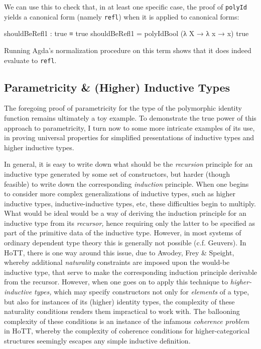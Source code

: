 \documentclass[
  12pt]{article}
\newenvironment{Shaded}{\begin{snugshade}}{\end{snugshade}}
\newcommand{\NormalTok}[1]{\textcolor[rgb]{0.12,0.11,0.11}{#1}}
\newcommand{\OtherTok}[1]{\textcolor[rgb]{0.00,0.43,0.16}{#1}}
\begin{document}
We can use this to check that, in at least one specific case, the proof
of \texttt{polyId} yields a canonical form (namely \texttt{refl}) when
it is applied to canonical forms:

\begin{Shaded}
\begin{Highlighting}[]
\NormalTok{    shouldBeRefl1 }\OtherTok{:}\NormalTok{ true ≡ true}
\NormalTok{    shouldBeRefl1 }\OtherTok{=}\NormalTok{ polyIdBool }\OtherTok{(λ}\NormalTok{ X }\OtherTok{→} \OtherTok{λ}\NormalTok{ x }\OtherTok{→}\NormalTok{ x}\OtherTok{)}\NormalTok{ true}
\end{Highlighting}
\end{Shaded}

Running Agda's normalization procedure on this term shows that it does
indeed evaluate to \texttt{refl}.

\subsection{Parametricity \& (Higher) Inductive
Types}\label{parametricity-higher-inductive-types}

The foregoing proof of parametricity for the type of the polymorphic
identity function remains ultimately a toy example. To demonstrate the
true power of this approach to parametricity, I turn now to some more
intricate examples of its use, in proving universal properties for
simplified presentations of inductive types and higher inductive types.

In general, it is easy to write down what should be the \emph{recursion}
principle for an inductive type generated by some set of constructors,
but harder (though feasible) to write down the corresponding
\emph{induction} principle. When one begins to consider more complex
generalizations of inductive types, such as higher inductive types,
inductive-inductive types, etc, these difficulties begin to multiply.
What would be ideal would be a way of deriving the induction principle
for an inductive type from its \emph{recursor,} hence requiring only the
latter to be specified as part of the primitive data of the inductive
type. However, in most systems of ordinary dependent type theory this is
generally not possible (c.f. Geuvers). In HoTT, there is one way around
this issue, due to Awodey, Frey \& Speight, whereby additional
\emph{naturality} constraints are imposed upon the would-be inductive
type, that serve to make the corresponding induction principle derivable
from the recursor. However, when one goes on to apply this technique to
\emph{higher-inductive types,} which may specify constructors not only
for \emph{elements} of a type, but also for instances of its (higher)
identity types, the complexity of these naturality conditions renders
them impractical to work with. The ballooning complexity of these
conditions is an instance of the infamous \emph{coherence problem} in
HoTT, whereby the complexity of coherence conditions for
higher-categorical structures seemingly escapes any simple inductive
definition.
\end{document}

